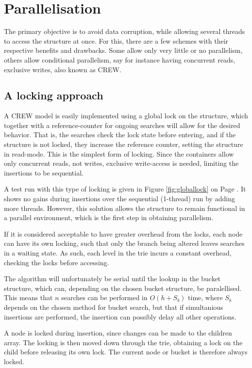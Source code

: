\section{Parallelisation}
The primary objective is to avoid data corruption, while allowing several
threads to access the structure at once. For this, there are a few schemes with
their respective benefits and drawbacks. Some allow only very little or no
parallelism, others allow conditional parallelism, say for instance having
concurrent reads, exclusive writes, also known as CREW.

\subsection{A locking approach}
A CREW model is easily implemented using a global lock on the structure, which
together with a reference-counter for ongoing searches will allow for the
desired behavior. That is, the searches check the lock state before entering,
and if the structure is not locked, they increase the reference counter,
setting the structure in read-mode. This is the simplest form of locking.
Since the \STL containers allow only concurrent reads, not writes, exclusive
write-access is needed, limiting the insertions to be sequential.

A test run with this type of locking is given in Figure \ref{fig:globallock}
on Page \pageref{fig:globallock}.
It shows no gains during insertions over the sequential (1-thread) run by
adding more threads. However, this solution allows the structure to remain
functional in a parallel environment, which is the first step in obtaining
parallelism.


If it is considered acceptable to have greater overhead from the locks, each
node can have its own locking, such that only the branch being altered
leaves searches in a waiting state. As such, each level in the trie incurs a
constant overhead, checking the locks before accessing.

The algorithm will unfortunately be serial until the lookup in the bucket
structure, which can, depending on the chosen bucket structure, be
paralellised. This means that $n$ searches can be performed in $O(h+S_b)$ time,
where $S_b$ depends on the chosen method for bucket search, but that if
simultanious insertions are performed, the insertion can possibly delay all
other operations. 

A node is locked during insertion, since changes can be made to the children
array. The locking is then moved down through the trie, obtaining a lock on
the child before releasing its own lock. The current node or bucket is
therefore always locked.

